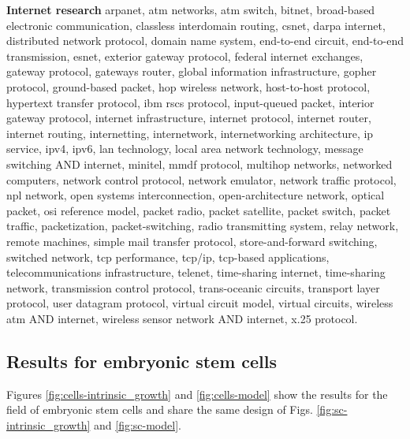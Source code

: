 \documentclass[draft,final]{vutinfth} %
\begin{document}
\vspace{2mm}\noindent\textbf{Internet research}
arpanet, atm networks, atm switch, bitnet, broad-based electronic communication, classless interdomain routing, csnet, darpa internet, distributed network protocol, domain name system, end-to-end circuit, end-to-end transmission, esnet, exterior gateway protocol, federal internet exchanges, gateway protocol, gateways router, global information infrastructure, gopher protocol, ground-based packet, hop wireless network, host-to-host protocol, hypertext transfer protocol, ibm rscs protocol, input-queued packet, interior gateway protocol, internet infrastructure, internet protocol, internet router, internet routing, internetting, internetwork, internetworking architecture, ip service, ipv4, ipv6, lan technology, local area network technology, message switching AND internet, minitel, mmdf protocol, multihop networks, networked computers, network control protocol, network emulator, network traffic protocol, npl network, open systems interconnection, open-architecture network, optical packet, osi reference model, packet radio, packet satellite, packet switch, packet traffic, packetization, packet-switching, radio transmitting system, relay network, remote machines, simple mail transfer protocol, store-and-forward switching, switched network, tcp performance, tcp/ip, tcp-based applications, telecommunications infrastructure, telenet, time-sharing internet, time-sharing network, transmission control protocol, trans-oceanic circuits, transport layer protocol, user datagram protocol, virtual circuit model, virtual circuits, wireless atm AND internet, wireless sensor network AND internet, x.25 protocol.

\subsection{Results for embryonic stem cells}
\label{app:embryo}
Figures \ref{fig:cells-intrinsic_growth} and \ref{fig:cells-model} show the results for the field of embryonic stem cells and share the same design of Figs. \ref{fig:sc-intrinsic_growth} and \ref{fig:sc-model}.
\end{document}

